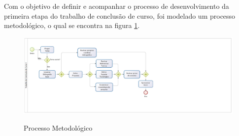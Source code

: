 Com o objetivo de definir e acompanhar o processo de desenvolvimento da primeira etapa do trabalho de conclusão de curso, foi modelado um processo metodológico, o qual se encontra na figura \ref{img:processo}.

\begin{figure}[H]
	\centering
	\caption{Processo Metodológico}
	\includegraphics[scale=0.6]{figuras/processo.eps}
	\label{img:processo}
\end{figure}

